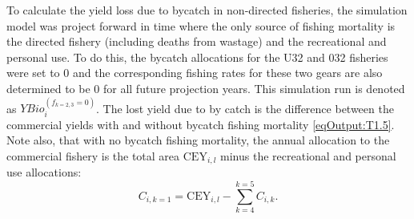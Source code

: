 To calculate the yield loss due to bycatch in non-directed fisheries, the simulation model was project forward in time where the only source of fishing mortality is the directed fishery (including deaths from wastage) and the recreational and personal use.  To do this, the bycatch allocations for the U32 and 032 fisheries were set to 0 and the corresponding fishing rates for these two gears are also determined to be 0 for all future projection years.  This simulation run is denoted as $YBio_i^{(f_{k=2,3}=0)}$.  The lost yield due to by catch is the difference between the commercial yields with and without bycatch fishing mortality \eqref{eqOutput:T1.5}.  Note also, that with no bycatch fishing mortality, the annual allocation to the commercial fishery is the total area $\mathrm{CEY}_{i,l}$ minus the recreational and personal use allocations:
\[ C_{i,k=1} = \mathrm{CEY}_{i,l} - \sum_{k=4}^{k=5} C_{i,k}. \]




































